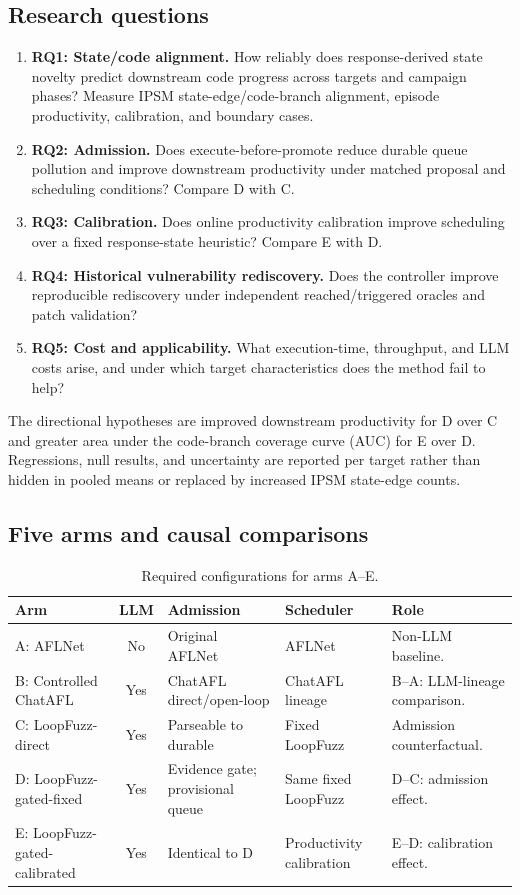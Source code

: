 \documentclass[final,5p,times,number]{elsarticle}
\begin{document}
\subsection{Research questions}
\begin{enumerate}
\item \textbf{RQ1: State/code alignment.} How reliably does response-derived state novelty predict downstream code progress across targets and campaign phases? Measure IPSM state-edge/code-branch alignment, episode productivity, calibration, and boundary cases.
\item \textbf{RQ2: Admission.} Does execute-before-promote reduce durable queue pollution and improve downstream productivity under matched proposal and scheduling conditions? Compare D with C.
\item \textbf{RQ3: Calibration.} Does online productivity calibration improve scheduling over a fixed response-state heuristic? Compare E with D.
\item \textbf{RQ4: Historical vulnerability rediscovery.} Does the controller improve reproducible rediscovery under independent reached/triggered oracles and patch validation?
\item \textbf{RQ5: Cost and applicability.} What execution-time, throughput, and LLM costs arise, and under which target characteristics does the method fail to help?
\end{enumerate}
The directional hypotheses are improved downstream productivity for D over C and greater area under the code-branch coverage curve (AUC) for E over D. Regressions, null results, and uncertainty are reported per target rather than hidden in pooled means or replaced by increased IPSM state-edge counts.

\subsection{Five arms and causal comparisons}
\begin{table}[!tbp]
\centering\small
\caption{Required configurations for arms A--E.}
\label{tab:arms}
\begin{tabularx}{\textwidth}{l c Y Y Y}
\toprule
Arm & LLM & Admission & Scheduler & Role \\
\midrule
A: AFLNet & No & Original AFLNet & AFLNet & Non-LLM baseline. \\
B: Controlled ChatAFL & Yes & ChatAFL direct/open-loop & ChatAFL lineage & B--A: LLM-lineage comparison. \\
C: LoopFuzz-direct & Yes & Parseable to durable & Fixed LoopFuzz & Admission counterfactual. \\
D: LoopFuzz-gated-fixed & Yes & Evidence gate; provisional queue & Same fixed LoopFuzz & D--C: admission effect. \\
E: LoopFuzz-gated-calibrated & Yes & Identical to D & Productivity calibration & E--D: calibration effect. \\
\bottomrule
\end{tabularx}
\end{table}
\end{document}
